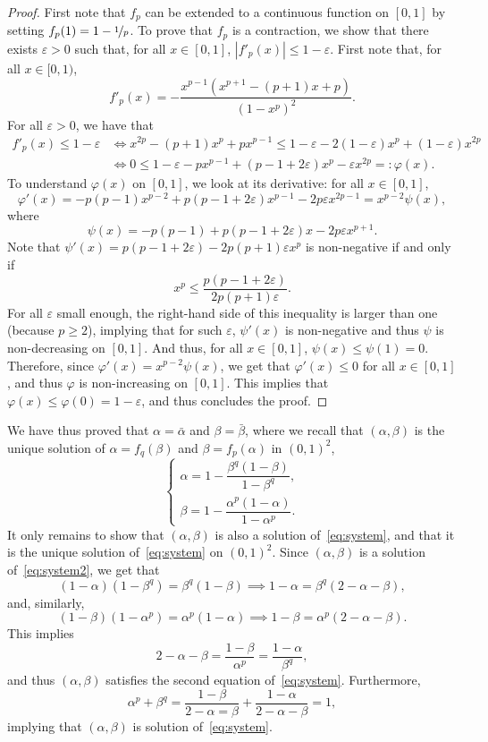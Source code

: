 \begin{proof}
First note that $f_p$ can be extended to a continuous function on $[0,1]$ by setting $f_p(1) = 1-\nicefrac1p$. To prove that $f_p$ is a contraction, we show that there exists $\varepsilon>0$ such that, for all $x\in[0,1]$, $|f'_p(x)|\leq 1-\varepsilon$.
First note that, for all $x\in [0,1)$,
\[
f'_p(x) = -\frac{x^{p-1}(x^{p+1}-(p+1)x+{p})}{(1-x^p)^2}.
\]
For all $\varepsilon>0$, we have that
\begin{align*}
f'_p(x)\leq 1-\varepsilon
&\iff x^{2p}-(p+1)x^p +px^{p-1}
\leq 1-\varepsilon -2(1-\varepsilon)x^p+(1-\varepsilon) x^{2p}\\
&\iff 0\leq 1-\varepsilon - px^{p-1} + (p-1+2\varepsilon)x^p-\varepsilon x^{2p}
=:\varphi(x).
\end{align*}
To understand $\varphi(x)$ on $[0,1]$, we look at its derivative: for all $x\in [0,1]$,
\[
\varphi'(x)
= -p(p-1)x^{p-2}+p(p-1+2\varepsilon)x^{p-1}-2p\varepsilon x^{2p-1} = x^{p-2}\psi(x),
\]
where
\[
\psi(x) = -p(p-1)+p(p-1+2\varepsilon)x-2p\varepsilon x^{p+1}.
\]
Note that $\psi'(x) = p(p-1+2\varepsilon)-2p(p+1)\varepsilon x^p$ is non-negative if and only if
\[
x^p\leq \frac{p(p-1+2\varepsilon)}{2p(p+1)\varepsilon}.
\]
For all $\varepsilon$ small enough, the right-hand side of this inequality is larger than one (because $p\geq 2$), implying that for such $\varepsilon$, $\psi'(x)$ is non-negative and thus $\psi$ is non-decreasing on $[0,1]$.
And thus, for all $x\in [0,1]$, $\psi(x)\leq \psi(1) = 0$.
Therefore, since $\varphi'(x) = x^{p-2}\psi(x)$, we get that $\varphi'(x)\leq 0$ for all $x\in [0,1]$,
and thus $\varphi$ is non-increasing on $[0,1]$. This implies that
$\varphi(x)\leq \varphi(0) = 1-\varepsilon$, and thus concludes the proof.
\end{proof}

We have thus proved that $\alpha = \bar\alpha$ and $\beta = \bar\beta$,
where we recall that $(\alpha, \beta)$ is the unique solution of $\alpha = f_q(\beta)$ and $\beta = f_p(\alpha)$ in $(0,1)^2$, \ie
\begin{equation}\label{eq:system2}
\begin{cases}
\alpha = 1-\dfrac{\beta^q(1-\beta)}{1-\beta^q},\\[5pt]
\beta = 1-\dfrac{\alpha^p(1-\alpha)}{1-\alpha^p}.
\end{cases}
\end{equation}
It only remains to show that $(\alpha,\beta)$ is also {a} solution of~\eqref{eq:system},
and that it is the unique solution of~\eqref{eq:system} on $(0,1)^2$.
Since $(\alpha,\beta)$ is {a} solution of~\eqref{eq:system2}, we get that
\[
(1-\alpha)(1-\beta^q) =\beta^q(1-\beta)
\implies 1-\alpha=\beta^q(2-\alpha-\beta),
\]
and, similarly,
\[
(1-\beta)(1-\alpha^p) =\alpha^p(1-\alpha)
\implies 1-\beta=\alpha^p(2-\alpha-\beta).
\]
This implies
\[
2-\alpha-\beta = \frac{1-\beta}{\alpha^p} = \frac{1-\alpha}{\beta^q},
\]
and thus $(\alpha,\beta)$ satisfies the second equation of~\eqref{eq:system}.
Furthermore,
\[
\alpha^p+\beta^q = \frac{1-\beta}{2-\alpha=\beta} + \frac{1-\alpha}{2-\alpha-\beta} = 1,
\]
implying that $(\alpha,\beta)$ is solution of~\eqref{eq:system}.

